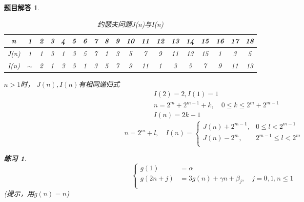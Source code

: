 \documentclass[mode=geye]{elegantnote}
\newtheorem{exercise}{练习}
\newtheorem{answer}{题目解答}
\begin{document}
\begin{answer}
	\begin{table}[htbp]
		\centering
		\small
		\caption{约瑟夫问题J(n)与I(n)}
		\begin{tabular}{c|c cc cccc cccccccc ccc}
			\toprule
			n 
			& 1 
			& 2 & 3 
			& 4 & 5 & 6 & 7 
			& 8 & 9 & 10 & 11 & 12 & 13 & 14 & 15 
			& 16 & 17 & 18 \\
			\midrule
			J(n) 
			& 1 
			& 1 & 3 
			& 1 & 3 & 5 & 7 
			& 1 & 3	& 5 & 7 & 9 & 11 & 13 & 15
			& 1 & 3 & 5 \\
			\midrule
			I(n) 
			& $\sim$ 
			& 2  
			& 1 & 3 & 5  
			& 1 & 3	& 5 & 7 & 9 & 11 
			& 1 & 3	& 5 & 7 & 9 & 11 &13 \\
			\bottomrule
		\end{tabular}%
		\label{tab:JNIN}%
	\end{table}%

$ n >1 $时， $ J(n), I(n) $有相同递归式
\begin{align*}
	& I(2) = 2, I(1) = 1\\
	& n=2^m + 2^{m-1}+k, \quad 0\leqslant k \leqslant 2^m + 2^{m-1}\\
	& I(n) = 2k+1 
\end{align*}
\begin{equation*}
	n = 2^m + l ,\quad I(n) =
	\left\{
	\begin{array}{ll}
		J(n)+2^{m-1}, 	& 0 		\leqslant l < 2^{m-1} 	\\
		J(n)-2^{m}, 	& 2^{m-1}	\leqslant l < 2^{m} 	\\
	\end{array}
	\right.
\end{equation*}

\begin{exercise}
	\begin{equation*}
		\left\{
		\begin{array}{rl}
			g(1) 	&= \alpha	\\
			g(2n+j)	&= 3g(n)+\gamma n + \beta_j, \quad j=0,1, n\leqslant 1\\
		\end{array}
		\right.
	\end{equation*}
(提示，用$ g(n)=n $)
\end{exercise}


\end{answer}
\end{document}
